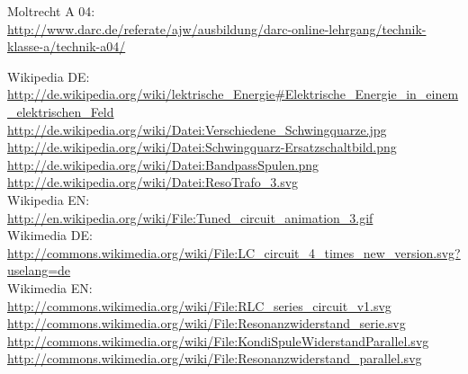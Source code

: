 \begin{thebibliography}{}
       Moltrecht A 04: \\
                    \url{http://www.darc.de/referate/ajw/ausbildung/darc-online-lehrgang/technik-klasse-a/technik-a04/}
    
        Wikipedia DE: \\
                    \url{http://de.wikipedia.org/wiki/lektrische_Energie#Elektrische_Energie_in_einem_elektrischen_Feld}\\ 
                    \url{http://de.wikipedia.org/wiki/Datei:Verschiedene_Schwingquarze.jpg}\\
                    \url{http://de.wikipedia.org/wiki/Datei:Schwingquarz-Ersatzschaltbild.png}\\
                    \url{http://de.wikipedia.org/wiki/Datei:BandpassSpulen.png}\\
    				\url{http://de.wikipedia.org/wiki/Datei:ResoTrafo_3.svg}\\
    				
    	Wikipedia EN:\\
    				\url{http://en.wikipedia.org/wiki/File:Tuned_circuit_animation_3.gif}\\
    				
    	Wikimedia DE:\\
    				\url{http://commons.wikimedia.org/wiki/File:LC_circuit_4_times_new_version.svg?uselang=de}\\
   \vspace{1cm}
   	Wikimedia EN:\\
   					\url{http://commons.wikimedia.org/wiki/File:RLC_series_circuit_v1.svg}\\
   					\url{http://commons.wikimedia.org/wiki/File:Resonanzwiderstand_serie.svg}\\
   					\url{http://commons.wikimedia.org/wiki/File:KondiSpuleWiderstandParallel.svg}\\
   					\url{http://commons.wikimedia.org/wiki/File:Resonanzwiderstand_parallel.svg}\\
   				  					
\end{thebibliography} 



